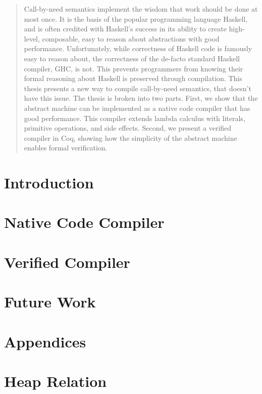 \documentclass[botnum, fleqn]{unmeethesis}
\begin{document}
\begin{abstract}
Call-by-need semantics implement the wisdom that work should be done at most
once. It is the basis of the popular programming language Haskell, and is often
credited with Haskell's success in its ability to create high-level, composable,
easy to reason about abstractions with good performance. Unfortunately, while
correctness of Haskell code is famously easy to reason about, the correctness of
the de-facto standard Haskell compiler, GHC, is not. This prevents programmers
from knowing their formal reasoning about Haskell is preserved through
compilation. This thesis presents a new way to compile call-by-need semantics,
that doesn't have this issue. The thesis is broken into two parts. First, we
show that the abstract machine can be implemented as a native code compiler that
has good performance. This compiler extends lambda calculus with literals,
primitive operations, and side effects. Second, we present a verified compiler
in Coq, showing how the simplicity of the abstract machine enables formal
verification. 
\clearpage %
\end{abstract}

\tableofcontents
\listoffigures
\listoftables

\mainmatter

\chapter{Introduction}


\chapter{Native Code Compiler}











\chapter{Verified Compiler}










\chapter{Future Work}

\chapter*{Appendices}

\appendix


\chapter{Heap Relation} 



\end{document}
